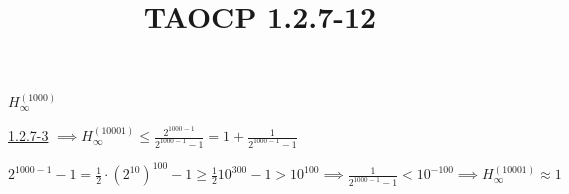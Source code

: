 \documentclass{article}
\title{TAOCP 1.2.7\mbox{-}12}
\begin{document}
\maketitle

\( H_{\infty}^{(1000)} \)

\href{./1.2.7-3.pdf}{1.2.7\mbox{-}3} \( \implies H_{\infty}^{(10001)} \leq \frac{2^{1000-1}}{2^{1000-1}-1} = 1 + \frac{1}{2^{1000-1}-1} \)

\( 2^{1000-1}-1 = \frac{1}{2} \cdot {(2^{10})}^{100} - 1 \geq \frac{1}{2} 10^{300} - 1 > 10^{100} \implies \frac{1}{2^{1000-1}-1} < 10^{-100} \implies H_{\infty}^{(10001)} \approx 1 \)
\end{document}
